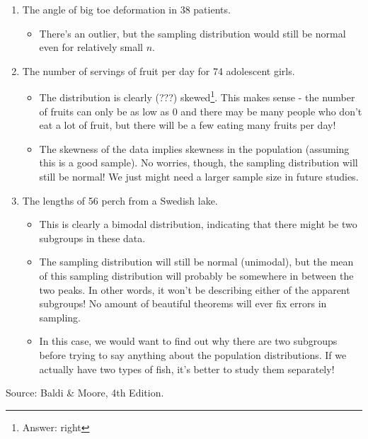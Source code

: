 \documentclass[
  letterpaper,
  DIV=11,
  numbers=noendperiod]{scrreprt}
\providecommand{\tightlist}{%
  \setlength{\itemsep}{0pt}\setlength{\parskip}{0pt}}\usepackage{longtable,booktabs,array}
\begin{document}
\begin{enumerate}
\def\labelenumi{\alph{enumi}.}
\tightlist
\item
  The angle of big toe deformation in 38 patients.

  \begin{itemize}
  \tightlist
  \item
    There's an outlier, but the sampling distribution would still be
    normal even for relatively small \(n\).
  \end{itemize}
\item
  The number of servings of fruit per day for 74 adolescent girls.

  \begin{itemize}
  \tightlist
  \item
    The distribution is clearly (???) skewed\footnote{Answer: right}.
    This makes sense - the number of fruits can only be as low as 0 and
    there may be many people who don't eat a lot of fruit, but there
    will be a few eating many fruits per day!
  \item
    The skewness of the data implies skewness in the population
    (assuming this is a good sample). No worries, though, the sampling
    distribution will still be normal! We just might need a larger
    sample size in future studies.
  \end{itemize}
\item
  The lengths of 56 perch from a Swedish lake.

  \begin{itemize}
  \tightlist
  \item
    This is clearly a bimodal distribution, indicating that there might
    be two subgroups in these data.
  \item
    The sampling distribution will still be normal (unimodal), but the
    mean of this sampling distribution will probably be somewhere in
    between the two peaks. In other words, it won't be describing either
    of the apparent subgroups! No amount of beautiful theorems will ever
    fix errors in sampling.
  \item
    In this case, we would want to find out why there are two subgroups
    before trying to say anything about the population distributions. If
    we actually have two types of fish, it's better to study them
    separately!
  \end{itemize}
\end{enumerate}

Source: Baldi \& Moore, 4th Edition.
\end{document}
